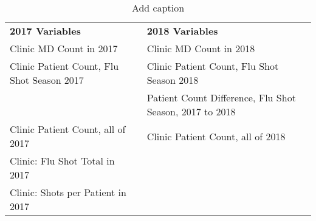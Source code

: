\begin{table}[htbp]
  \centering
  \caption{Add caption}
    \begin{tabular}{lr}
    \textbf{2017 Variables} & \multicolumn{1}{l}{\textbf{2018 Variables}} \\
    Clinic MD Count in 2017 & \multicolumn{1}{l}{Clinic MD Count in 2018} \\
    Clinic Patient Count, Flu Shot Season 2017 & \multicolumn{1}{l}{Clinic Patient Count, Flu Shot Season 2018} \\
          & \multicolumn{1}{l}{Patient Count Difference, Flu Shot Season, 2017 to 2018} \\
    Clinic Patient Count, all of 2017 & \multicolumn{1}{l}{Clinic Patient Count, all of 2018} \\
    Clinic: Flu Shot Total in 2017 &  \\
    Clinic: Shots per Patient in 2017 &  \\
    \end{tabular}%
  \label{tab:addlabel}%
\end{table}%
